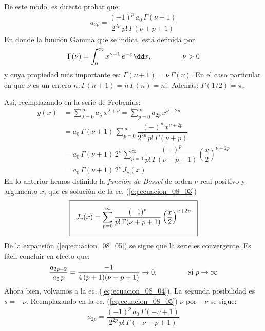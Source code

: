 De este modo, es directo probar que:
\begin{align}
a_{2p} = \dfrac{(-1)^{p} \, a_{0} \, \Gamma (\nu + 1)}{2^{2p} \, p! \, \Gamma (\nu + p + 1)}
\label{eq:ecuacion_08_05}
\end{align}
En donde la función Gamma que se indica, está definida por
\begin{align*}
\Gamma (\nu) = \int_{0}^{\infty} x^{\nu-1} \, e^{-x} \dd x, \hspace{1.5cm} \nu > 0
\end{align*}
y cuya propiedad más importante es: $\Gamma (\nu + 1) = \nu \, \Gamma (\nu)$. En el caso particular en que $\nu$ es un entero $n: \Gamma (n + 1) = n \, \Gamma (n) = n!$. Además: $\Gamma (1/2) = \pi$.
\par
Así, reemplazando en la serie de Frobenius:
\begin{align*}
y(x) &= \sum_{\lambda=0}^{\infty} a_{\lambda} \, x^{\lambda+\nu} = \sum_{p=0}^{\infty} a_{2p} \, x^{\nu+2p} \\[0.5em]
&= a_{0} \, \Gamma (\nu + 1) \, \sum_{p=0}^{\infty} \dfrac{(-)^{p} \, x^{\nu+2p}}{2^{2p} \, p! \, \Gamma (\nu + p)} \\[0.5em]
&= a_{0} \, \Gamma (\nu + 1) \, 2^{\nu} \, \sum_{p=0}^{\infty} \dfrac{(-)^{p}}{p! \, \Gamma (\nu + p + 1)} \left( \dfrac{x}{2} \right)^{\nu+2p} \\[0.5em]
&= a_{0} \, \Gamma (\nu + 1) \, 2^{\nu} \, J_{\nu} (x)
\end{align*}
En lo anterior hemos definido la \emph{función de Bessel} de orden $\nu$ real positivo y argumento $x$, que es solución de la ec. (\ref{eq:ecuacion_08_03})
\begin{align}
\setlength{\fboxsep}{3\fboxsep}\boxed{
J_{v} (x) = \sum_{p=0}^{\infty} \dfrac{(-1)^{p}}{p! \, \Gamma (\nu + p + 1)} \left( \dfrac{x}{2} \right)^{\nu+2p}}
\label{eq:ecuacion_08_06}
\end{align}
De la expansión (\ref{eq:ecuacion_08_05}) se sigue que la serie es convergente. Es fácil concluir en efecto que:
\begin{align*}
\dfrac{a_{2p+2}}{a_{2} \, p} = \dfrac{-1}{4 \, (p+1)(\nu + p + 1)} \to 0,\hspace{1.5cm} \mbox{si } p \to \infty
\end{align*}
Ahora bien, volvamos a la ec. (\ref{eq:ecuacion_08_04}). La segunda posibilidad es $s = -\nu$. Reemplazando en la ec. (\ref{eq:ecuacion_08_05}) $\nu$ por $-\nu$ se sigue:
\begin{align*}
a_{2p} = \dfrac{(-1)^{p} \, a_{0} \, \Gamma (-\nu + 1)}{2^{2p} \, p! \, \Gamma (-\nu + p + 1)}
\end{align*}
